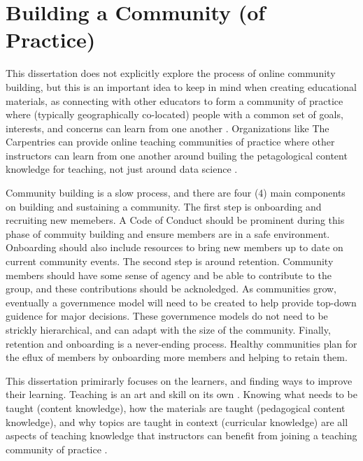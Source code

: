 \documentclass[../main.tex]{subfiles}
\begin{document}
        

    \section{Building a Community (of Practice)}

        This dissertation does not explicitly explore the process of online community building,
        but this is an important idea to keep in mind when creating educational materials,
        as connecting with other educators to form a community of practice
        where (typically geographically co-located) people with a common set of goals, interests, and concerns
        can learn from one another
        \cite{wilson2019teaching}.
        Organizations like The Carpentries can provide online teaching communities of practice
        where other instructors can learn from one another around
        builing the petagological content knowledge for teaching, not just around data science
        \cite{CarpentriesHowWe, shulmanThoseWhoUnderstand1986}.

        Community building is a slow process, and there are four (4) main components on building and sustaining a community.
        The first step is onboarding and recruiting new memebers.
        A Code of Conduct should be prominent during this phase of commuity building and ensure members are in a safe environment.
        Onboarding should also include resources to bring new members up to date on current community events.
        The second step is around retention.
        Community members should have some sense of agency and be able to contribute to the group,
        and these contributions should be acknoledged.
        As communities grow, eventually a governmence model will need to be created to help
        provide top-down guidence for major decisions.
        These governmence models do not need to be strickly hierarchical,
        and can adapt with the size of the community.
        Finally, retention and onboarding is a never-ending process.
        Healthy communities plan for the eflux of members by onboarding more members and helping to retain them.

        This dissertation primirarly focuses on the learners, and finding ways to improve their learning.
        Teaching is an art and skill on its own
        \cite{greenBuildingBetterTeacher2014, wilson2019teaching}.
        Knowing what needs to be taught (content knowledge),
        how the materials are taught (pedagogical content knowledge), and
        why topics are taught in context (curricular knowledge)
        are all aspects of teaching knowledge that instructors can benefit from joining a teaching
        community of practice
        \cite{shulmanThoseWhoUnderstand1986, greenBuildingBetterTeacher2014, wilson2019teaching}.
\end{document}
